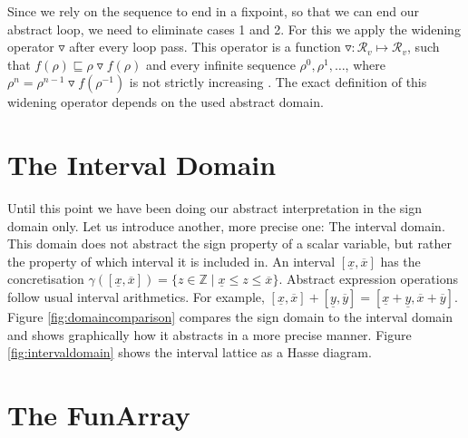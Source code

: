 \begin{enumerate}
\begin{center}
\end{center}
\end{enumerate} 

\noindent Since we rely on the sequence to end in a fixpoint, so that we can end our abstract loop, we need to eliminate cases 1 and 2. For this we apply the widening operator $\triangledown$ after every loop pass. This operator is a function $\triangledown: \mathcal{R}_v\mapsto \mathcal{R}_v$, such that $f(\rho)\sqsubseteq\rho\triangledown f(\rho)$ and every infinite sequence $\rho^0,\rho^1,\dots$, where $\rho^n=\rho^{n-1}\triangledown f(\rho^{-1})$ is not strictly increasing \cite{cousot1977}. The exact definition of this widening operator depends on the used abstract domain.

\section{The Interval Domain}





Until this point we have been doing our abstract interpretation in the sign domain only. Let us introduce another, more precise one: The interval domain. This domain does not abstract the sign property of a scalar variable, but rather the property of which interval it is included in. An interval $[\underline{x},\overline{x}]$ has the concretisation $\gamma([\underline{x},\overline{x}])=\{z\in\mathbb{Z} \;|\; \underline{x}\leq z \leq \overline{x}\}$. Abstract expression operations follow usual interval arithmetics. For example, $[\underline{x},\overline{x}]+[\underline{y},\overline{y}]=[\underline{x}+\underline{y},\overline{x}+\overline{y}]$. Figure \ref{fig:domaincomparison} compares the sign domain to the interval domain and shows graphically how it abstracts in a more precise manner. Figure \ref{fig:intervaldomain} shows the interval lattice as a Hasse diagram.

\section{The FunArray}

